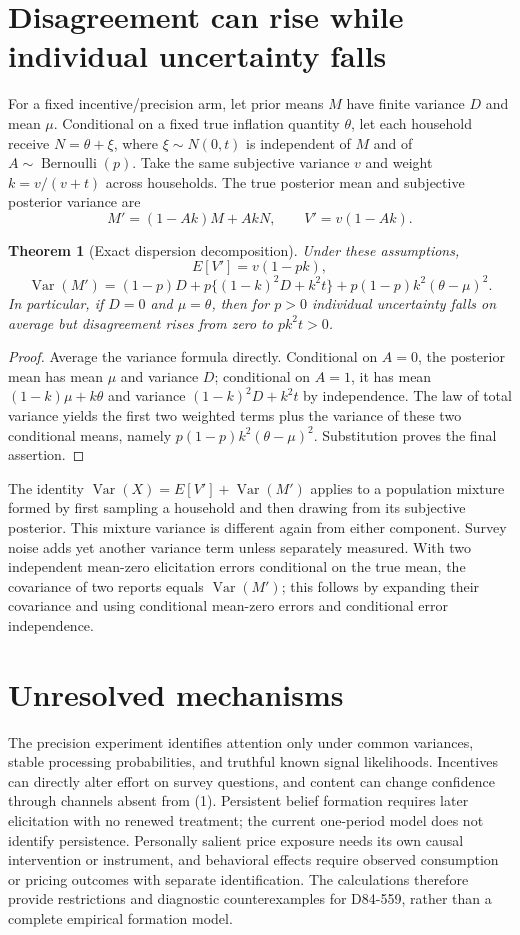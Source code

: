 \documentclass[11pt]{article}
\newtheorem{theorem}{Theorem}
\theoremstyle{definition}
\begin{document}
\section*{Disagreement can rise while individual uncertainty falls}
For a fixed incentive/precision arm, let prior means $M$ have finite variance $D$ and mean $\mu$. Conditional on a fixed true inflation quantity $\theta$, let each household receive $N=\theta+\xi$, where $\xi\sim N(0,t)$ is independent of $M$ and of $A\sim\operatorname{Bernoulli}(p)$. Take the same subjective variance $v$ and weight $k=v/(v+t)$ across households. The true posterior mean and subjective posterior variance are
\[
 M'=(1-Ak)M+AkN,\qquad V'=v(1-Ak).
\]
\begin{theorem}[Exact dispersion decomposition]
Under these assumptions,
\[
 E[V']=v(1-pk),
\]
\[
 \operatorname{Var}(M')=(1-p)D+p\{(1-k)^2D+k^2t\}
       +p(1-p)k^2(\theta-\mu)^2.
 \tag{3}
\]
In particular, if $D=0$ and $\mu=\theta$, then for $p>0$ individual uncertainty falls on average but disagreement rises from zero to $pk^2t>0$.
\end{theorem}
\begin{proof}
Average the variance formula directly. Conditional on $A=0$, the posterior mean has mean $\mu$ and variance $D$; conditional on $A=1$, it has mean $(1-k)\mu+k\theta$ and variance $(1-k)^2D+k^2t$ by independence. The law of total variance yields the first two weighted terms plus the variance of these two conditional means, namely $p(1-p)k^2(\theta-\mu)^2$. Substitution proves the final assertion.
\end{proof}
The identity $\operatorname{Var}(X)=E[V']+\operatorname{Var}(M')$ applies to a population mixture formed by first sampling a household and then drawing from its subjective posterior. This mixture variance is different again from either component. Survey noise adds yet another variance term unless separately measured. With two independent mean-zero elicitation errors conditional on the true mean, the covariance of two reports equals $\operatorname{Var}(M')$; this follows by expanding their covariance and using conditional mean-zero errors and conditional error independence.

\section*{Unresolved mechanisms}
The precision experiment identifies attention only under common variances, stable processing probabilities, and truthful known signal likelihoods. Incentives can directly alter effort on survey questions, and content can change confidence through channels absent from (1). Persistent belief formation requires later elicitation with no renewed treatment; the current one-period model does not identify persistence. Personally salient price exposure needs its own causal intervention or instrument, and behavioral effects require observed consumption or pricing outcomes with separate identification. The calculations therefore provide restrictions and diagnostic counterexamples for D84-559, rather than a complete empirical formation model.
\end{document}
